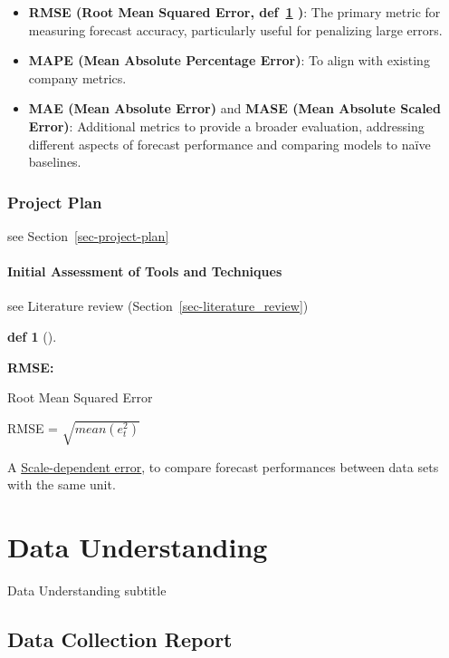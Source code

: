 \documentclass[
  american,
  10,
  a4paper,
]{book}
\theoremstyle{definition}
\newtheorem{definition}{def}[chapter]
\theoremstyle{remark}
\begin{document}
\begin{itemize}
\item
  \textbf{RMSE (Root Mean Squared Error, def~\ref{def-01-RMSE} )}: The
  primary metric for measuring forecast accuracy, particularly useful
  for penalizing large errors.
\item
  \textbf{MAPE (Mean Absolute Percentage Error)}: To align with existing
  company metrics.
\item
  \textbf{MAE (Mean Absolute Error)} and \textbf{MASE (Mean Absolute
  Scaled Error)}: Additional metrics to provide a broader evaluation,
  addressing different aspects of forecast performance and comparing
  models to naïve baselines.
\end{itemize}

\subsection{Project Plan}\label{project-plan}

see Section~\ref{sec-project-plan}

\subsubsection{Initial Assessment of Tools and
Techniques}\label{initial-assessment-of-tools-and-techniques}

see Literature review (Section~\ref{sec-literature_review})

\begin{definition}[]\protect\hypertarget{def-01-RMSE}{}\label{def-01-RMSE}

\textbf{RMSE:}

Root Mean Squared Error

RMSE = \(\sqrt{mean(e^2_t)}\)

A
\href{https://otexts.com/fpp3/accuracy.html\#scale-dependent-errors}{Scale-dependent
error}, to compare forecast performances between data sets with the same
unit.

\end{definition}

\chapter{Data Understanding}\label{data-understanding}

Data Understanding subtitle

\hfill\break

\section{Data Collection Report}\label{data-collection-report}
\end{document}

